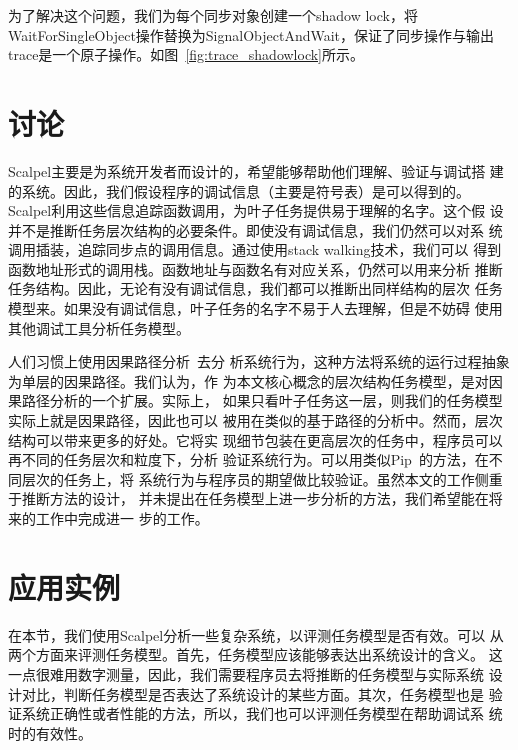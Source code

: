 为了解决这个问题，我们为每个同步对象创建一个shadow lock，将
WaitForSingleObject操作替换为SignalObjectAndWait，保证了同步操作与输出
trace是一个原子操作。如图~\ref{fig:trace_shadowlock}所示。

\section{讨论}
\label{sec:scp:discussion}

Scalpel主要是为系统开发者而设计的，希望能够帮助他们理解、验证与调试搭
建的系统。因此，我们假设程序的调试信息（主要是符号表）是可以得到的。
Scalpel利用这些信息追踪函数调用，为叶子任务提供易于理解的名字。这个假
设并不是推断任务层次结构的必要条件。即使没有调试信息，我们仍然可以对系
统调用插装，追踪同步点的调用信息。通过使用stack walking技术，我们可以
得到函数地址形式的调用栈。函数地址与函数名有对应关系，仍然可以用来分析
推断任务结构。因此，无论有没有调试信息，我们都可以推断出同样结构的层次
任务模型来。如果没有调试信息，叶子任务的名字不易于人去理解，但是不妨碍
使用其他调试工具分析任务模型。

人们习惯上使用因果路径分析~\cite{pinpoint, project5, pip, magpie}去分
析系统行为，这种方法将系统的运行过程抽象为单层的因果路径。我们认为，作
为本文核心概念的层次结构任务模型，是对因果路径分析的一个扩展。实际上，
如果只看叶子任务这一层，则我们的任务模型实际上就是因果路径，因此也可以
被用在类似的基于路径的分析中。然而，层次结构可以带来更多的好处。它将实
现细节包装在更高层次的任务中，程序员可以再不同的任务层次和粒度下，分析
验证系统行为。可以用类似Pip~\cite{pip}的方法，在不同层次的任务上，将
系统行为与程序员的期望做比较验证。虽然本文的工作侧重于推断方法的设计，
并未提出在任务模型上进一步分析的方法，我们希望能在将来的工作中完成进一
步的工作。


\section{应用实例}
\label{sec:scp:case}

在本节，我们使用Scalpel分析一些复杂系统，以评测任务模型是否有效。可以
从两个方面来评测任务模型。首先，任务模型应该能够表达出系统设计的含义。
这一点很难用数字测量，因此，我们需要程序员去将推断的任务模型与实际系统
设计对比，判断任务模型是否表达了系统设计的某些方面。其次，任务模型也是
验证系统正确性或者性能的方法，所以，我们也可以评测任务模型在帮助调试系
统时的有效性。

